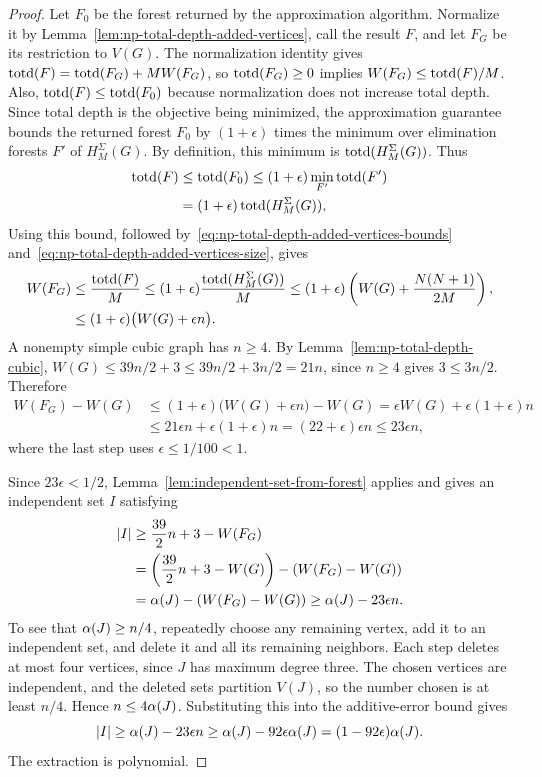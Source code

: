 \begin{proof}
Let $F_0$ be the forest returned by the approximation algorithm.
Normalize it by Lemma~\ref{lem:np-total-depth-added-vertices}, call
the result $F$, and let $F_G$ be its restriction to $V(G)$. The
normalization identity gives $\operatorname{totd}(F)=\operatorname{totd}(F_G)+MW(F_G)$, so
$\operatorname{totd}(F_G)\ge0$ implies $W(F_G)\le\operatorname{totd}(F)/M$. Also,
$\operatorname{totd}(F)\le\operatorname{totd}(F_0)$ because normalization does not increase total
depth. Since total depth is the objective being minimized, the
approximation guarantee bounds the returned forest $F_0$ by $(1+\epsilon)$
times the minimum over elimination forests $F'$ of $H^{\Sigma}_M(G)$.
By definition, this minimum is $\operatorname{totd}(H^{\Sigma}_M(G))$. Thus
\[
 \begin{aligned}
 \operatorname{totd}(F)&\le\operatorname{totd}(F_0)
 \le(1+\epsilon)\min_{F'}\operatorname{totd}(F')\\
 &=(1+\epsilon)\operatorname{totd}(H^{\Sigma}_M(G)),
 \end{aligned}
\]
Using this bound, followed by~\eqref{eq:np-total-depth-added-vertices-bounds}
and~\eqref{eq:np-total-depth-added-vertices-size}, gives
\[
\begin{aligned}
 W(F_G)&\le\frac{\operatorname{totd}(F)}M
       \le(1+\epsilon)\frac{\operatorname{totd}(H^{\Sigma}_M(G))}M
       \le(1+\epsilon)\left(W(G)+\frac{N(N+1)}{2M}\right),\\
       &\le(1+\epsilon)\bigl(W(G)+\epsilon n\bigr).
\end{aligned}
\]
A nonempty simple cubic graph has $n\ge4$. By
Lemma~\ref{lem:np-total-depth-cubic},
$W(G)\le39n/2+3\le39n/2+3n/2=21n$, since $n\ge4$ gives
$3\le3n/2$. Therefore
\begin{equation}\label{eq:np-total-depth-path-error}
\begin{aligned}
 W(F_G)-W(G)
 &\le(1+\epsilon)\bigl(W(G)+\epsilon n\bigr)-W(G)
  =\epsilon W(G)+\epsilon(1+\epsilon)n\\
 &\le21\epsilon n+\epsilon(1+\epsilon)n
  =(22+\epsilon)\epsilon n\le23\epsilon n,
\end{aligned}
\end{equation}
where the last step uses $\epsilon\le1/100<1$.

Since $23\epsilon<1/2$, Lemma~\ref{lem:independent-set-from-forest}
applies and gives an independent set $I$ satisfying
\[
\begin{aligned}
 |I|&\ge\frac{39}{2}n+3-W(F_G)\\
    &=\left(\frac{39}{2}n+3-W(G)\right)-(W(F_G)-W(G))\\
    &=\alpha(J)-(W(F_G)-W(G))\ge\alpha(J)-23\epsilon n.
\end{aligned}
\]
To see that $\alpha(J)\ge n/4$, repeatedly choose any remaining
vertex, add it to an independent set, and delete it and all its
remaining neighbors. Each step deletes at most four vertices, since
$J$ has maximum degree three. The chosen vertices are independent,
and the deleted sets partition $V(J)$, so the number chosen is at
least $n/4$. Hence $n\le4\alpha(J)$. Substituting this into the
additive-error bound gives
\[
 |I|\ge\alpha(J)-23\epsilon n
     \ge\alpha(J)-92\epsilon\alpha(J)
     =(1-92\epsilon)\alpha(J).
\]
The extraction is polynomial.
\end{proof}

